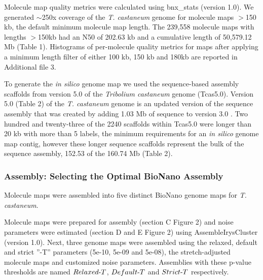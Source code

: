 \documentclass{bmcart}
\begin{document}
Molecule map quality metrics were calculated using bnx\_stats (version 1.0). We generated $\sim$250x coverage of the \textit{T. castaneum} genome for molecule maps $>$150 kb, the default minimum molecule map length. The 239,558 molecule maps with lengths $>$150kb had an N50 of 202.63 kb and a cumulative length of 50,579.12 Mb (Table 1). Histograms of per-molecule quality metrics for maps after applying a minimum length filter of either 100 kb, 150 kb and 180kb are reported in Additional file 3. 

To generate the \textit{in silico} genome map we used the sequence-based assembly scaffolds from version 5.0 of the \textit{Tribolium castaneum} genome (Tcas5.0). Version 5.0 (Table 2) of the \textit{T. castaneum} genome is an updated version of the sequence assembly that was created by adding 1.03 Mb of sequence to version 3.0 \cite{Beetle2008}. Two hundred and twenty-three of the 2240 scaffolds within Tcas5.0 were longer than 20 kb with more than 5 labels, the minimum requirements for an \textit{in silico} genome map contig, however these longer sequence scaffolds represent the bulk of the sequence assembly, 152.53 of the 160.74 Mb (Table 2).


\subsubsection*{Assembly: Selecting the Optimal BioNano Assembly}
Molecule maps were assembled into five distinct BioNano genome maps for \textit{T. castaneum}. 

Molecule maps were prepared for assembly (section C Figure 2) and noise parameters were estimated (section D and E Figure 2) using AssembleIrysCluster (version 1.0). Next, three genome maps were assembled using the relaxed, default and strict ”-T” parameters (5e-10, 5e-09 and 5e-08), the stretch-adjusted molecule maps and customized noise parameters. Assemblies with these p-value thresholds are named $Relaxed\textnormal{-}T$, $Default\textnormal{-}T$ and $Strict\textnormal{-}T$ respectively. 
\end{document}
